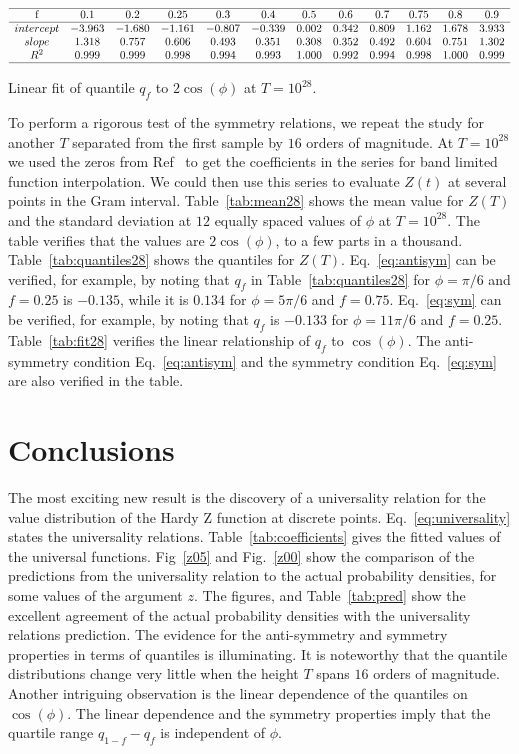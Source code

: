 \documentclass[twoside]{article}
\begin{document}
\begin{table}
\centering \(\begin{array}{cccccccccccc}
\hline
$f$&0.1&0.2&0.25&0.3&0.4&0.5&0.6&0.7&0.75&0.8&0.9\\
\hline
intercept&-3.963&-1.680&-1.161&-0.807&-0.339&0.002&0.342&0.809&1.162&1.678&3.933\\
slope&1.318&0.757&0.606&0.493&0.351&0.308&0.352&0.492&0.604&0.751&1.302\\
R^2&0.999&0.999&0.998&0.994&0.993&1.000&0.992&0.994&0.998&1.000&0.999\\
\hline
\end{array}\)
\caption{Linear fit of quantile $q_f$ to $2\cos(\phi)$ at $T=10^{28}$.}
\label{tab:fit28}
\end{table}


To perform a rigorous test of the symmetry relations, we repeat the study for another $T$ separated from the first sample by $16$ orders of magnitude. At $T=10^{28}$ we used the  zeros from Ref~\cite{hiary 2010} to get the coefficients in the series for band limited function interpolation. We could then use this series to evaluate  $Z(t)$  at several points in the Gram interval.
Table~\ref{tab:mean28} shows the mean value for $Z(T)$  and the standard deviation at $12$ equally spaced values of $\phi$ at $T=10^{28}$. The table verifies that the values are $2\cos(\phi)$, to a few parts in a thousand. Table~\ref{tab:quantiles28} shows the quantiles for $Z(T)$.  Eq.~\ref{eq:antisym} can be verified, for example, by noting that $q_f$ in Table~\ref{tab:quantiles28}
for $\phi=\pi/6$ and $f=0.25$ is $-0.135$, while it is $0.134$ for $\phi=5\pi/6$ and $f=0.75$. Eq.~\ref{eq:sym} can be verified, for example, by noting that $q_f$ is $-0.133$ for $\phi=11\pi/6$ and $f=0.25$. Table~\ref{tab:fit28} verifies the linear relationship of $q_f$ to $\cos(\phi)$. The anti-symmetry condition Eq.~\ref{eq:antisym}  and the symmetry condition Eq.~\ref{eq:sym} are also verified in the table.


\section{\label{conclusions}Conclusions}

The most exciting new result is the discovery of a universality relation for the 
value distribution of the Hardy Z function at discrete points. Eq.~\ref{eq:universality}
states the universality relations. Table~\ref{tab:coefficients} gives the fitted values 
of the universal functions.
Fig~\ref{z05} and Fig.~\ref{z00} show the comparison of the predictions from the universality 
relation to the actual probability densities, for some values of the argument $z$. The figures, and 
Table~\ref{tab:pred} show the excellent agreement of the actual probability densities with the
universality relations prediction.
The evidence for the anti-symmetry and symmetry properties 
in terms of quantiles is illuminating. 
It is noteworthy that the quantile distributions change very little 
when the height $T$ spans $16$ orders of magnitude. 
Another intriguing observation is the linear dependence of the quantiles 
on $\cos(\phi)$. The linear dependence and the symmetry properties imply that 
the quartile range $q_{1-f}-q_f$ is independent of $\phi$.
\end{document}
